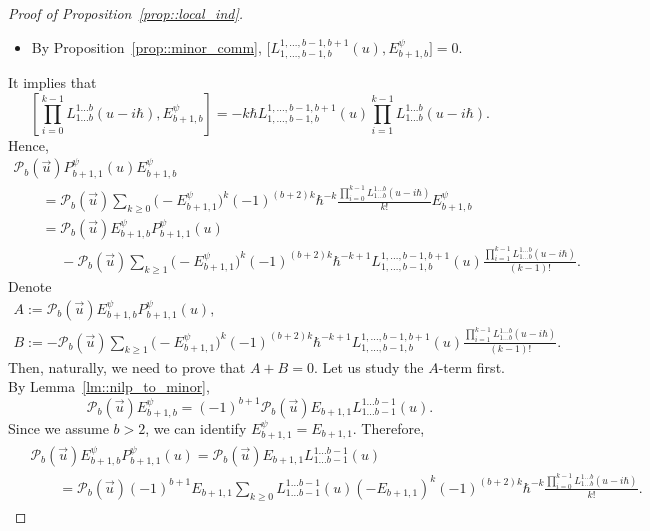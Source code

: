 \documentclass[10pt,a4paper]{article}
\numberwithin{equation}{section}
\newcommand{\calP}{\mathcal{P}}
\begin{document}
\begin{proof}[Proof of Proposition~\ref{prop::local_ind}]
\begin{itemize}
			\item By Proposition~\ref{prop::minor_comm},
$
			\bigl[L^{1,\dots,b-1,b+1}_{1,\dots,b-1,b}(u),E_{b+1,b}^{\psi}\bigr] = 0$.
		\end{itemize}
		It implies that
		\[
		\left[\prod_{i=0}^{k-1} L_{1\dots b}^{1\dots b}(u-i\hbar), E_{b+1,b}^{\psi} \right] = -k\hbar L_{1,\dots,b-1,b}^{1,\dots,b-1,b+1}(u) \prod_{i=1}^{k-1} L_{1\dots b}^{1\dots b}(u-i\hbar).
		\]
		Hence,
		\begin{gather*}
			\calP_{b}(\vec{u})P_{b+1,1}^{\psi}(u) E_{b+1,b}^{\psi} \\
			\qquad= \calP_{b}(\vec{u})\sum\limits_{k\geq 0} \bigl(-E_{b+1,1}^{\psi}\bigr)^k (-1)^{(b+2)k} \hbar^{-k} \frac{\prod_{i=0}^{k-1} L_{1\dots b}^{1\dots b}(u-i\hbar)}{k!} E_{b+1,b}^{\psi} \\
		\qquad	=\calP_{b}(\vec{u}) E_{b+1,b}^{\psi} P_{b+1,1}^{\psi}(u) \\
		\phantom{\qquad	=}{}	- \calP_{b}(\vec{u})\sum\limits_{k\geq 1} \bigl(-E_{b+1,1}^{\psi}\bigr)^k (-1)^{(b+2)k} \hbar^{-k+1} L_{1,\dots,b-1,b}^{1,\dots,b-1,b+1}(u) \frac{\prod_{i=1}^{k-1} L_{1\dots b}^{1\dots b}(u-i\hbar)}{(k-1)!}.
		\end{gather*}
		Denote
		\begin{gather}
				A := \calP_{b}(\vec{u}) E_{b+1,b}^{\psi} P_{b+1,1}^{\psi}(u),\nonumber \\
				B := -\calP_{b}(\vec{u})\sum\limits_{k\geq 1} \bigl(-E_{b+1,1}^{\psi}\bigr)^k (-1)^{(b+2)k} \hbar^{-k+1} L_{1,\dots,b-1,b}^{1,\dots,b-1,b+1}(u) \frac{\prod_{i=1}^{k-1} L_{1\dots b}^{1\dots b}(u-i\hbar)}{(k-1)!}	.		\label{eq::ab_terms}
		\end{gather}
		Then, naturally, we need to prove that
		$
		A + B = 0$.
		Let us study the $A$-term first. By Lemma~\ref{lm::nilp_to_minor},
		\[
		\calP_{b}(\vec{u}) E_{b+1,b}^{\psi} = (-1)^{b+1} \calP_{b}(\vec{u}) E_{b+1,1} L_{1\dots b-1}^{1\dots b-1}(u).
		\]
		Since we assume $b>2$, we can identify $E_{b+1,1}^{\psi} = E_{b+1,1}$. Therefore,
		\begin{gather*}
\begin{split}
& \calP_{b}(\vec{u}) E_{b+1,b}^{\psi} P_{b+1,1}^{\psi}(u)
=\calP_{b}(\vec{u}) E_{b+1,1} L_{1\dots b-1}^{1\dots b-1}(u) \\
&	\qquad= \calP_{b}(\vec{u}) (-1)^{b+1} E_{b+1,1} \sum\limits_{k\geq 0} L_{1\dots b-1}^{1\dots b-1}(u) (-E_{b+1,1})^k (-1)^{(b+2)k} \hbar^{-k} \frac{\prod_{i=0}^{k-1} L_{1\dots b}^{1\dots b}(u-i\hbar)}{k!}.
\end{split}
		\end{gather*}

\end{proof}
\end{document}
